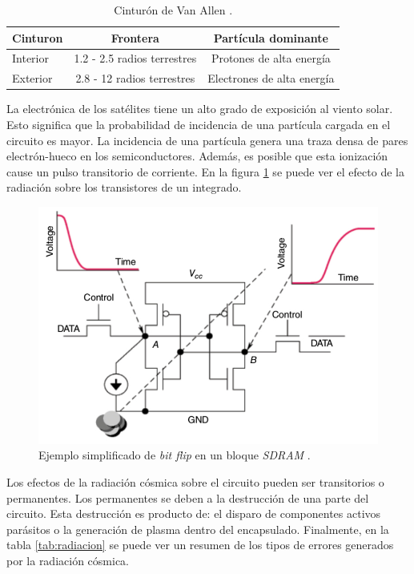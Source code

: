 \begin{table}[h]
	\centering
	\caption[Cinturón de Van Allen]{Cinturón de Van Allen \citep{WEBSITE:structure_space_radiation}.}
	\begin{tabular}{l c c}    
		\toprule
		\textbf{Cinturon} & \textbf{Frontera}           & \textbf{Partícula dominante}\\
		\midrule
		Interior          & 1.2 - 2.5 radios terrestres & Protones de alta energía\\		
		Exterior          & 2.8 - 12 radios terrestres  & Electrones de alta energía\\
		\bottomrule
		\hline
	\end{tabular}
	\label{tab:capasmagneticas}
\end{table}

\newpage
La electrónica de los satélites tiene un alto grado de exposición al viento solar.
Esto significa que la probabilidad de incidencia de una partícula cargada en el circuito es mayor.
La incidencia de una partícula genera una traza densa de pares electrón-hueco en los semiconductores.
Además, es posible que esta ionización cause un pulso transitorio de corriente.
En la figura \ref{fig:bitflip} se puede ver el efecto de la radiación sobre los transistores de un integrado.

\begin{figure}[htbp]
	\centering
	\includegraphics[width=\textwidth]{./Figures/bitflip.jpg}
    \caption{Ejemplo simplificado de \emph{bit flip} en un bloque \emph{SDRAM} \citep{WEBSITE:effects_on_devices}.}
	\label{fig:bitflip}
\end{figure}

Los efectos de la radiación cósmica sobre el circuito pueden ser transitorios o permanentes.
Los permanentes se deben a la destrucción de una parte del circuito.
Esta destrucción es producto de: el disparo de componentes activos parásitos o la generación de plasma dentro del encapsulado.
Finalmente, en la tabla \ref{tab:radiacion} se puede ver un resumen de los tipos de errores generados por la radiación cósmica.

